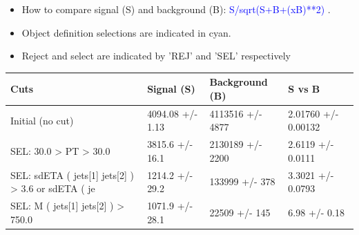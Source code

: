 \documentclass[a4paper, 10pt]{article}
\begin{document}
\begin{itemize}
  \item How to compare signal (S) and background (B): \textcolor{blue}{S/\-sqrt(S+B+(xB)**2)} .
   \item Object definition selections are indicated in cyan.  \item Reject and select are indicated by 'REJ' and 'SEL' respectively
\end{itemize}
\begin{table}[H]
  \begin{center}
    \begin{tabular}{|m{36.0mm}|m{36.0mm}|m{36.0mm}|m{33.0mm}|}
      \hline
      {\cellcolor{yellow}        Cuts}& {\cellcolor{yellow}         Signal (S)}& {\cellcolor{yellow}         Background (B)}& {\cellcolor{yellow}         S vs B}\\
      \hline
      {\cellcolor{white}         Initial (no cut)}& {\cellcolor{white}         4094.08 +/\-- 1.13}& {\cellcolor{white}         4113516 +/\-- 4877}& {\cellcolor{white}         2.01760 +/\-- 0.00132}\\
      \hline
      {\cellcolor{white} SEL: 30.0 > PT > 30.0}& {\cellcolor{white}         3815.6 +/\-- 16.1}& {\cellcolor{white}         2130189 +/\-- 2200}& {\cellcolor{white}         2.6119 +/\-- 0.0111}\\
      \hline
      {\cellcolor{white} SEL: sdETA ( jets[1] jets[2] ) > 3.6 or sdETA ( je}& {\cellcolor{white}         1214.2 +/\-- 29.2}& {\cellcolor{white}         133999 +/\-- 378}& {\cellcolor{white}         3.3021 +/\-- 0.0793}\\
      \hline
      {\cellcolor{white} SEL: M ( jets[1] jets[2] ) > 750.0}& {\cellcolor{white}         1071.9 +/\-- 28.1}& {\cellcolor{white}         22509 +/\-- 145}& {\cellcolor{white}         6.98 +/\-- 0.18}\\
\hline
    \end{tabular}
  \end{center}
\end{table}
\end{document}
